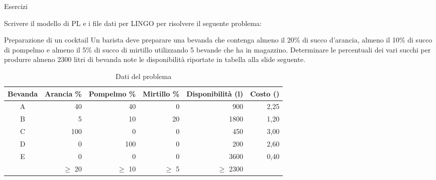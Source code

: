 \documentclass{beamer}
\begin{document}
\generatitolo


\begin{frame}[allowframebreaks]
{Esercizi}

Scrivere il modello di PL e i file dati per LINGO
per risolvere il seguente problema:

\begin{block}{Preparazione di un cocktail}
Un barista deve preparare una bevanda che contenga
almeno il 20\% di succo d'arancia,
almeno il 10\% di succo di pompelmo e
almeno il  5\% di succo di mirtillo
utilizzando 5 bevande che ha in magazzino.
Determinare le percentuali dei vari succhi per produrre
almeno 2300 litri di bevanda note le disponibilit\`a
riportate in tabella alla slide seguente.
\end{block}

\framebreak

\begin{table}
\begin{tabular}{crrrrr}\toprule
{\scriptsize \bf Bevanda} & {\scriptsize \bf Arancia \%} & {\scriptsize \bf Pompelmo \%} & {\scriptsize \bf Mirtillo \%} &{\scriptsize \bf Disponibilit\`a (l)}& {\scriptsize \bf Costo (\EUR{})}\\\midrule
A &  40 &  40 &   0 &  900 & 2,25\\
B &   5 &  10 &  20 & 1800 & 1,20\\
C & 100 &   0 &   0 &  450 & 3,00\\
D &   0 & 100 &   0 &  200 & 2,60\\
E &   0 &   0 &   0 & 3600 & 0,40\\\midrule
  &$\ge$ 20&$\ge$ 10&$\ge$  5&$\ge$ 2300\\\bottomrule
\end{tabular}
\caption{Dati del problema}
\end{table}
\end{frame}
\end{document}
